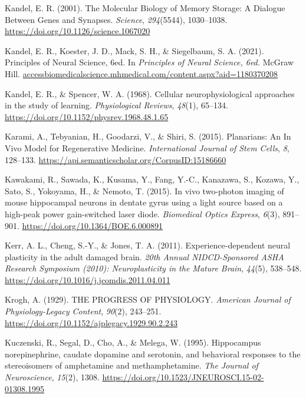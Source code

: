\documentclass[
  jou,
  floatsintext,
  longtable,
  nolmodern,
  notxfonts,
  notimes,
  donotrepeattitle,
  colorlinks=true,linkcolor=blue,citecolor=blue,urlcolor=blue]{apa7}
\newlength{\cslhangindent}
\newenvironment{CSLReferences}[2] %
 {\begin{list}{}{%
  \setlength{\itemindent}{0pt}
  \setlength{\leftmargin}{0pt}
  \setlength{\parsep}{0pt}
  \ifodd #1
   \setlength{\leftmargin}{\cslhangindent}
   \setlength{\itemindent}{-1\cslhangindent}
  \fi
  \setlength{\itemsep}{#2\baselineskip}}}
 {\end{list}}
\begin{document}
\begin{CSLReferences}{1}{0}
Kandel, E. R. (2001). The {Molecular} {Biology} of {Memory} {Storage}:
{A} {Dialogue} {Between} {Genes} and {Synapses}. \emph{Science},
\emph{294}(5544), 1030--1038.
\url{https://doi.org/10.1126/science.1067020}

Kandel, E. R., Koester, J. D., Mack, S. H., \& Siegelbaum, S. A. (2021).
Principles of {Neural} {Science}, 6ed. In \emph{Principles of {Neural}
{Science}, 6ed.} McGraw Hill.
\href{https://accessbiomedicalscience.mhmedical.com/content.aspx?aid=1180370208}{accessbiomedicalscience.mhmedical.com/content.aspx?aid=1180370208}

Kandel, E. R., \& Spencer, W. A. (1968). Cellular neurophysiological
approaches in the study of learning. \emph{Physiological Reviews},
\emph{48}(1), 65--134.
\url{https://doi.org/10.1152/physrev.1968.48.1.65}

Karami, A., Tebyanian, H., Goodarzi, V., \& Shiri, S. (2015).
Planarians: An {In} {Vivo} {Model} for {Regenerative} {Medicine}.
\emph{International Journal of Stem Cells}, \emph{8}, 128--133.
\url{https://api.semanticscholar.org/CorpusID:15186660}

Kawakami, R., Sawada, K., Kusama, Y., Fang, Y.-C., Kanazawa, S., Kozawa,
Y., Sato, S., Yokoyama, H., \& Nemoto, T. (2015). In vivo two-photon
imaging of mouse hippocampal neurons in dentate gyrus using a light
source based on a high-peak power gain-switched laser diode.
\emph{Biomedical Optics Express}, \emph{6}(3), 891--901.
\url{https://doi.org/10.1364/BOE.6.000891}

Kerr, A. L., Cheng, S.-Y., \& Jones, T. A. (2011). Experience-dependent
neural plasticity in the adult damaged brain. \emph{20th Annual
NIDCD-Sponsored ASHA Research Symposium (2010): Neuroplasticity in the
Mature Brain}, \emph{44}(5), 538--548.
\url{https://doi.org/10.1016/j.jcomdis.2011.04.011}

Krogh, A. (1929). {THE} {PROGRESS} {OF} {PHYSIOLOGY}. \emph{American
Journal of Physiology-Legacy Content}, \emph{90}(2), 243--251.
\url{https://doi.org/10.1152/ajplegacy.1929.90.2.243}

Kuczenski, R., Segal, D., Cho, A., \& Melega, W. (1995). Hippocampus
norepinephrine, caudate dopamine and serotonin, and behavioral responses
to the stereoisomers of amphetamine and methamphetamine. \emph{The
Journal of Neuroscience}, \emph{15}(2), 1308.
\url{https://doi.org/10.1523/JNEUROSCI.15-02-01308.1995}


\end{CSLReferences}
\end{document}
